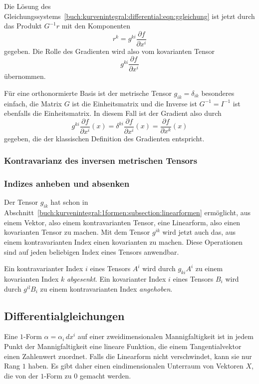 Die Lösung des
Gleichungssystems~\eqref{buch:kurvenintegral:differential:eqn:ggleichung}
ist jetzt durch das Produkt $G^{-1}r$ mit den Komponenten
\[
r^k = g^{ki}\frac{\partial f}{\partial x^i}
\]
gegeben.
Die Rolle des Gradienten wird also vom kovarianten Tensor
\[
g^{ki}\frac{\partial f}{\partial x^i}
\]
übernommen.

Für eine orthonormierte Basis ist der metrische Tensor $g_{ik}=\delta_{ik}$
besonderes einfach, die Matrix $G$ ist die Einheitsmatrix und die 
Inverse ist $G^{-1}=I^{-1}$ ist ebenfalls die Einheitsmatrix.
In diesem Fall ist der Gradient also durch
\[
g^{ki}\frac{\partial f}{\partial x^i}(x)
=
\delta^{ki}\frac{\partial f}{\partial x^i}(x)
=
\frac{\partial f}{\partial x^k}(x)
\]
gegeben, die der klassischen Definition des Gradienten entspricht.

%
%
\subsubsection{Kontravarianz des inversen metrischen Tensors}

%
%
\subsubsection{Indizes anheben und absenken}
Der Tensor $g_{ik}$ hat schon in
Abschnitt~\ref{buch:kurvenintegral:1formen:subsection:linearformen}
ermöglicht, aus einem Vektor, also einem kontravarianten Tensor,
eine Linearform, also einen kovarianten Tensor zu machen.
Mit dem Tensor $g^{ik}$ wird jetzt auch das, aus einem kontravarianten
Index einen kovarianten zu machen.
Diese Operationen sind auf jeden beliebigen Index eines Tensors
anwendbar.

\begin{definition}
Ein kontravarianter Index $i$ eines Tensors $A^i$ wird durch
$g_{ki}A^i$ zu einem kovarianten Index $k$ {\em abgesenkt}.
%
Ein kovarianter Index $i$ eines Tensors $B_i$ wird durch
$g^{il}B_i$ zu einem kontravarianten Index {\em angehoben}.
%
\end{definition}
 
%
%
\subsection{Differentialgleichungen}
Eine $1$-Form $\alpha = \alpha_i\,dx^i$ auf einer zweidimensionalen
Mannigfaltigkeit ist in jedem Punkt der Mannigfaltigkeit eine lineare
Funktion, die einem Tangentialvektor einen Zahlenwert zuordnet.
Falls die Linearform nicht verschwindet, kann sie nur Rang $1$
haben.
Es gibt daher einen eindimensionalen Unterraum von Vektoren $X$, die
von der $1$-Form zu $0$ gemacht werden.

